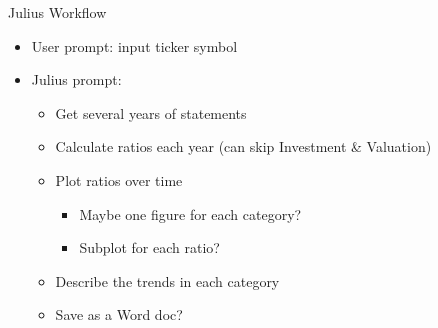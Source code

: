 \documentclass[10pt]{beamer}
\begin{document}
\begin{frame}{Julius Workflow}
\begin{itemize}
    \item User prompt: input ticker symbol
    \item Julius prompt:
\begin{itemize}
\item Get several years of statements
\item Calculate ratios each year (can skip Investment \& Valuation)
\item Plot ratios over time
\begin{itemize}
\item Maybe one figure for each category?
\item Subplot for each ratio?
\end{itemize}
\item Describe the trends in each category
\item Save as a Word doc?
\end{itemize}
\end{itemize}
\end{frame}
\end{document}
